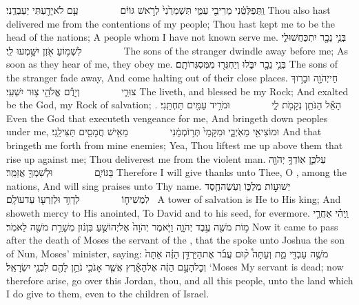 {וַֽתְּפַלְּטֵ֔נִי מֵרִיבֵ֖י עַמִּ֑י תִּשְׁמְרֵ֙נִי֙ לְרֹ֣אשׁ גּוֹיִ֔ם         עַ֥ם לֹא\maqqaf יָדַ֖עְתִּי יַעַבְדֻֽנִי׃}
{Thou also hast delivered me from the contentions of my people; Thou hast kept me to be the head of the nations; A people whom I have not known serve me.}
{בְּנֵ֥י נֵכָ֖ר יִתְכַּחֲשׁוּ\maqqaf לִ֑י לִשְׁמ֥וֹעַ אֹ֖זֶן יִשָּׁ֥מְעוּ לִֽי׃        }
{The sons of the stranger dwindle away before me; As soon as they hear of me, they obey me.}
{בְּנֵ֥י נֵכָ֖ר יִבֹּ֑לוּ וְיַחְגְּר֖וּ מִמִּסְגְּרוֹתָֽם׃}
{The sons of the stranger fade away, And come halting out of their close places.}
{חַי\maqqaf יְהֹוָ֖ה וּבָר֣וּךְ צוּרִ֑י         וְיָרֻ֕ם אֱלֹהֵ֖י צ֥וּר יִשְׁעִֽי׃}
{The \lord\space liveth, and blessed be my Rock; And exalted be the God, my Rock of salvation; .}
{הָאֵ֕ל הַנֹּתֵ֥ן נְקָמֹ֖ת לִ֑י         וּמֹרִ֥יד עַמִּ֖ים תַּחְתֵּֽנִי׃}
{Even the God that executeth vengeance for me, And bringeth down peoples under me,}
{וּמוֹצִיאִ֖י מֵאֹֽיְבָ֑י וּמִקָּמַי֙ תְּר֣וֹמְמֵ֔נִי         מֵאִ֥ישׁ חֲמָסִ֖ים תַּצִּילֵֽנִי׃}
{And that bringeth me forth from mine enemies; Yea, Thou liftest me up above them that rise up against me; Thou deliverest me from the violent man.}
{עַל\maqqaf כֵּ֛ן אֽוֹדְךָ֥ יְהֹוָ֖ה בַּגּוֹיִ֑ם         וּלְשִׁמְךָ֖ אֲזַמֵּֽר׃}
{Therefore I will give thanks unto Thee, O \lord, among the nations, And will sing praises unto Thy name.}
{ יְשׁוּע֣וֹת מַלְכּ֑וֹ וְעֹֽשֶׂה\maqqaf חֶ֧סֶד לִמְשִׁיח֛וֹ         לְדָוִ֥ד וּלְזַרְע֖וֹ עַד\maqqaf עוֹלָֽם׃ \petucha }
{A tower of salvation is He to His king; And showeth mercy to His anointed, To David and to his seed, for evermore.}
\label{haft_54}
\setcounter{chap}{1}
\setcounter{verse}{1}
{וַֽיְהִ֗י אַחֲרֵ֛י מ֥וֹת מֹשֶׁ֖ה עֶ֣בֶד יְהֹוָ֑ה וַיֹּ֤אמֶר יְהֹוָה֙ אֶל\maqqaf יְהוֹשֻׁ֣עַ בִּן\maqqaf נ֔וּן מְשָׁרֵ֥ת מֹשֶׁ֖ה לֵאמֹֽר׃}
{Now it came to pass after the death of Moses the servant of the \lord, that the \lord\space spoke unto Joshua the son of Nun, Moses’ minister, saying:}
{מֹשֶׁ֥ה עַבְדִּ֖י מֵ֑ת וְעַתָּה֩ ק֨וּם עֲבֹ֜ר אֶת\maqqaf הַיַּרְדֵּ֣ן הַזֶּ֗ה אַתָּה֙ וְכׇל\maqqaf הָעָ֣ם הַזֶּ֔ה אֶל\maqqaf הָאָ֕רֶץ אֲשֶׁ֧ר אָנֹכִ֛י נֹתֵ֥ן לָהֶ֖ם לִבְנֵ֥י יִשְׂרָאֵֽל׃}
{‘Moses My servant is dead; now therefore arise, go over this Jordan, thou, and all this people, unto the land which I do give to them, even to the children of Israel.}
